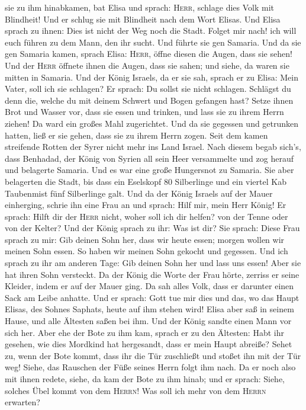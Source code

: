 sie zu ihm hinabkamen, bat Elisa und sprach: \textsc{Herr}, schlage dies
Volk mit Blindheit! Und er schlug sie mit Blindheit nach dem Wort
Elisas.  Und Elisa sprach zu ihnen: Dies ist nicht der
Weg noch die Stadt. Folget mir nach! ich will euch führen zu dem Mann,
den ihr sucht. Und führte sie gen Samaria.  Und da sie
gen Samaria kamen, sprach Elisa: \textsc{Herr}, öffne diesen die Augen,
dass sie sehen! Und der \textsc{Herr} öffnete ihnen die Augen, dass sie
sahen; und siehe, da waren sie mitten in Samaria.  Und
der König Israels, da er sie sah, sprach er zu Elisa: Mein Vater, soll
ich sie schlagen?  Er sprach: Du sollst sie nicht
schlagen. Schlägst du denn die, welche du mit deinem Schwert und Bogen
gefangen hast? Setze ihnen Brot und Wasser vor, dass sie essen und
trinken, und lass sie zu ihrem Herrn ziehen!  Da ward ein
großes Mahl zugerichtet. Und da sie gegessen und getrunken hatten, ließ
er sie gehen, dass sie zu ihrem Herrn zogen. Seit dem kamen streifende
Rotten der Syrer nicht mehr ins Land Israel.  Nach diesem
begab sich's, dass Benhadad, der König von Syrien all sein Heer
versammelte und zog herauf und belagerte Samaria.  Und es
war eine große Hungersnot zu Samaria. Sie aber belagerten die Stadt, bis
dass ein Eselskopf 80 Silberlinge und ein viertel Kab Taubenmist fünf
Silberlinge galt.  Und da der König Israels auf der Mauer
einherging, schrie ihn eine Frau an und sprach: Hilf mir, mein Herr
König!  Er sprach: Hilft dir der \textsc{Herr} nicht,
woher soll ich dir helfen? von der Tenne oder von der Kelter?
 Und der König sprach zu ihr: Was ist dir? Sie sprach:
Diese Frau sprach zu mir: Gib deinen Sohn her, dass wir heute essen;
morgen wollen wir meinen Sohn essen.  So haben wir meinen
Sohn gekocht und gegessen. Und ich sprach zu ihr am anderen Tage: Gib
deinen Sohn her und lass uns essen! Aber sie hat ihren Sohn versteckt.
 Da der König die Worte der Frau hörte, zerriss er seine
Kleider, indem er auf der Mauer ging. Da sah alles Volk, dass er
darunter einen Sack am Leibe anhatte.  Und er sprach:
Gott tue mir dies und das, wo das Haupt Elisas, des Sohnes Saphats,
heute auf ihm stehen wird!  Elisa aber saß in seinem
Hause, und alle Ältesten saßen bei ihm. Und der König sandte einen Mann
vor sich her. Aber ehe der Bote zu ihm kam, sprach er zu den Ältesten:
Habt ihr gesehen, wie dies Mordkind hat hergesandt, dass er mein Haupt
abreiße? Sehet zu, wenn der Bote kommt, dass ihr die Tür zuschließt und
stoßet ihn mit der Tür weg! Siehe, das Rauschen der Füße seines Herrn
folgt ihm nach.  Da er noch also mit ihnen redete, siehe,
da kam der Bote zu ihm hinab; und er sprach: Siehe, solches Übel kommt
von dem \textsc{Herrn}! Was soll ich mehr von dem \textsc{Herrn}
erwarten?

